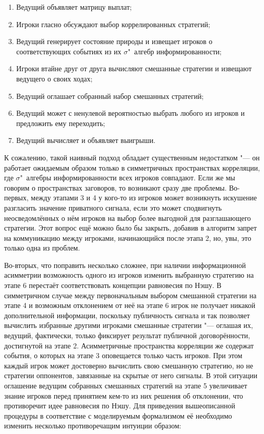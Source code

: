 \begin{enumerate}
	\item Ведущий объявляет матрицу выплат;
	\item Игроки гласно обсуждают выбор коррелированных стратегий;
	\item Ведущий генерирует состояние природы и извещает игроков о соответствующих событиях из их $\sigma$"~алгебр информированности;
	\item Игроки втайне друг от друга вычисляют смешанные стратегии и извещают ведущего о своих ходах;
	\item Ведущий оглашает собранный набор смешанных стратегий;
	\item Ведущий может с ненулевой вероятностью выбрать любого из игроков и предложить ему переходить;
	\item Ведущий вычисляет и объявляет выигрыши.
\end{enumerate}

К сожалению, такой наивный подход обладает существенным недостатком "--- он работает ожидаемым образом только в симметричных пространствах корреляции, где $\sigma$"~алгебры информированности всех игроков совпадают. Если же мы говорим о пространствах заговоров, то возникают сразу две проблемы. Во-первых, между этапами 3 и 4 у кого-то из игроков может возникнуть искушение разгласить значение приватного сигнала, если это может сподвигнуть неосведомлённых о нём игроков на выбор более выгодной для разглашающего стратегии. Этот вопрос ещё можно было бы закрыть, добавив в алгоритм запрет на коммуникацию между игроками, начинающийся после этапа 2, но, увы, это только одна из проблем.

Во-вторых, что поправить несколько сложнее, при наличии информационной асимметрии возможность одного из игроков изменить выбранную стратегию на этапе 6 перестаёт соответствовать концепции равновесия по Нэшу. В симметричном случае между первоначальным выбором смешанной стратегии на этапе 4 и возможным отклонением от неё на этапе 6 игрок не получает никакой дополнительной информации, поскольку публичность сигнала и так позволяет вычислить избранные другими игроками смешанные стратегии "--- оглашая их, ведущий, фактически, только фиксирует результат публичной договорённости, достигнутой на этапе 2. Асимметричные пространства корреляции же содержат события, о которых на этапе 3 оповещается только часть игроков. При этом каждый игрок может достоверно вычислить свою смешанную стратегию, но не стратегии оппонентов, завязанные на скрытые от него сигналы. В этой ситуации оглашение ведущим собранных смешанных стратегий на этапе 5 увеличивает знание игроков перед принятием кем-то из них решения об отклонении, что противоречит идее равновесия по Нэшу. Для приведения вышеописанной процедуры в соответствие с моделируемым формализмом её необходимо изменить несколько противоречащим интуиции образом:

